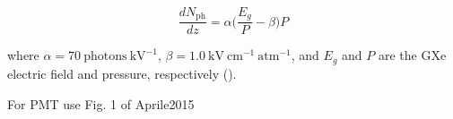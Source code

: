 \begin{equation}
\frac{dN_{\mathrm{ph}}}{dz} = \alpha \Big( \frac{E_{g}}{P} - \beta \Big) P
\label{eq:electronlum}
\end{equation}

\noindent where $\alpha = 70\ \mathrm{photons\ kV^{-1}}$, $\beta = 1.0\ \mathrm{kV\ cm^{-1}\ atm^{-1}}$, and $E_{g}$ and $P$ are the
GXe electric field and pressure, respectively ().

For PMT use Fig. 1 of Aprile2015